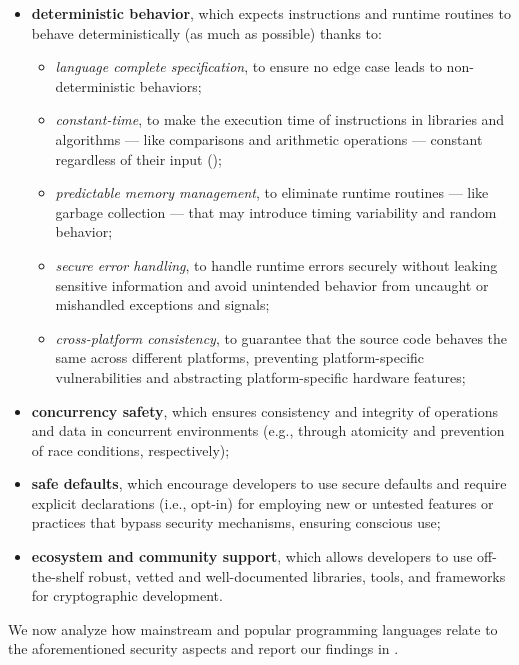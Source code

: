 \begin{itemize}
	\item \textbf{deterministic behavior}, which expects instructions and runtime routines to behave deterministically (as much as possible) thanks to: 
	\begin{itemize}
		\item \textit{language complete specification}, to ensure no edge case leads to non-deterministic behaviors;
		\item \textit{constant-time}, to make the execution time of instructions in libraries and algorithms --- like comparisons and arithmetic operations --- constant regardless of their input ();
		\item \textit{predictable memory management}, to eliminate runtime routines --- like garbage collection --- that may introduce timing variability and random behavior;
		\item \textit{secure error handling}, to handle runtime errors securely without leaking sensitive information and avoid unintended behavior from uncaught or mishandled exceptions and signals;
		\item \textit{cross-platform consistency}, to guarantee that the source code behaves the same across different platforms, preventing platform-specific vulnerabilities and abstracting platform-specific hardware features;
	\end{itemize}
	
	\item \textbf{concurrency safety}, which ensures consistency and integrity of operations and data in concurrent environments (e.g., through atomicity and prevention of race conditions, respectively);
	
	\item \textbf{safe defaults}, which encourage developers to use secure defaults and require explicit declarations (i.e., opt-in) for employing new or untested features or practices that bypass security mechanisms, ensuring conscious use;
	
	\item \textbf{ecosystem and community support}, which allows developers to use off-the-shelf robust, vetted and well-documented libraries, tools, and frameworks for cryptographic development.
\end{itemize}

We now analyze how mainstream and popular programming languages relate to the aforementioned security aspects and report our findings in .

